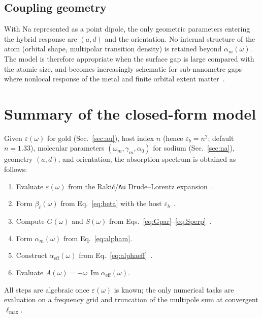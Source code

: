 \documentclass[11pt,a4paper]{article}
\begin{document}
\subsection{Coupling geometry}

With Na represented as a point dipole, the only geometric parameters entering
the hybrid response are $(a,d)$ and the orientation.  No internal structure of
the atom (orbital shape, multipolar transition density) is retained beyond
$\alpha_m(\omega)$.  The model is therefore appropriate when the surface gap is
large compared with the atomic size, and becomes increasingly schematic for
sub-nanometre gaps where nonlocal response of the metal and finite orbital
extent matter~\citep{ciraci2012,zhu2016}.

\section{Summary of the closed-form model}
\label{sec:summary}

Given $\varepsilon(\omega)$ for gold (Sec.~\ref{sec:au}), host index
$n$ (hence $\varepsilon_b=n^2$; default $n=1.33$), molecular parameters
$(\omega_m,\gamma_m,\alpha_0)$ for sodium (Sec.~\ref{sec:na}), geometry
$(a,d)$, and orientation, the absorption spectrum is obtained as follows:
\begin{enumerate}[leftmargin=1.4em]
  \item Evaluate $\varepsilon(\omega)$ from the Raki\'{c}/\texttt{Au}
        Drude--Lorentz expansion~\citep{rakic1998,oskooi2010}.
  \item Form $\beta_\ell(\omega)$ from Eq.~\eqref{eq:beta} with the host
        $\varepsilon_b$~\citep{bohren1983}.
  \item Compute $G(\omega)$ and $S(\omega)$ from
        Eqs.~\eqref{eq:Gpar}--\eqref{eq:Sperp}~\citep{gersten1980,gersten1981}.
  \item Form $\alpha_m(\omega)$ from Eq.~\eqref{eq:alpham}.
  \item Construct $\alpha_{\mathrm{eff}}(\omega)$ from
        Eq.~\eqref{eq:alphaeff}~\citep{gersten1980}.
  \item Evaluate $A(\omega)=-\omega\,\operatorname{Im}\alpha_{\mathrm{eff}}(\omega)$.
\end{enumerate}

\noindent
All steps are algebraic once $\varepsilon(\omega)$ is known; the only numerical
tasks are evaluation on a frequency grid and truncation of the multipole sum at
convergent $\ell_{\max}$.
\end{document}
